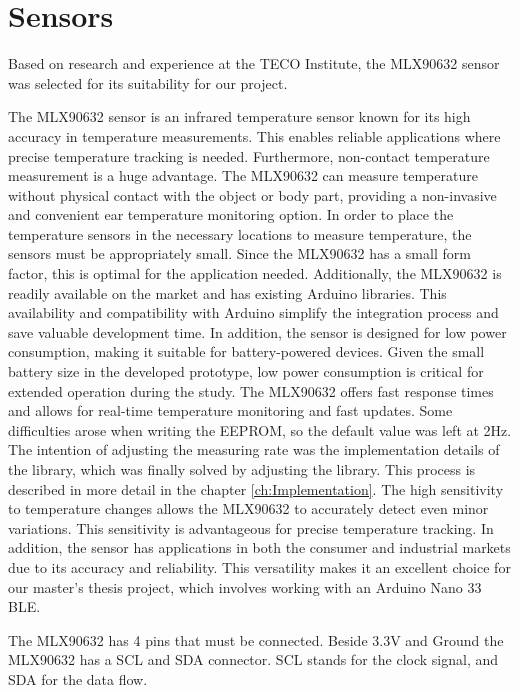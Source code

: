 
\section{Sensors}
\label{ch:Design:Prototype:Sensors}

Based on research and experience at the TECO Institute, the MLX90632 sensor was selected for its suitability for our project.

The MLX90632 sensor is an infrared temperature sensor known for its high accuracy in temperature measurements. This enables reliable applications where precise temperature tracking is needed.
Furthermore, non-contact temperature measurement is a huge advantage. 
The MLX90632 can measure temperature without physical contact with the object or body part, providing a non-invasive and convenient ear temperature monitoring option.
In order to place the temperature sensors in the necessary locations to measure temperature, the sensors must be appropriately small. 
Since the MLX90632 has a small form factor, this is optimal for the application needed.
Additionally, the MLX90632 is readily available on the market and has existing Arduino libraries. 
This availability and compatibility with Arduino simplify the integration process and save valuable development time.
In addition, the sensor is designed for low power consumption, making it suitable for battery-powered devices. 
Given the small battery size in the developed prototype, low power consumption is critical for extended operation during the study.
The MLX90632 offers fast response times and allows for real-time temperature monitoring and fast updates. 
Some difficulties arose when writing the EEPROM, so the default value was left at 2Hz.
The intention of adjusting the measuring rate was the implementation details of the library, which was finally solved by adjusting the library. 
This process is described in more detail in the chapter \ref{ch:Implementation}.
The high sensitivity to temperature changes allows the MLX90632 to accurately detect even minor variations. 
This sensitivity is advantageous for precise temperature tracking.
In addition, the sensor has applications in both the consumer and industrial markets due to its accuracy and reliability. 
This versatility makes it an excellent choice for our master's thesis project, which involves working with an Arduino Nano 33 BLE.

The MLX90632 has 4 pins that must be connected. Beside 3.3V and Ground the MLX90632 has a SCL and SDA connector. 
SCL stands for the clock signal, and SDA for the data flow.

